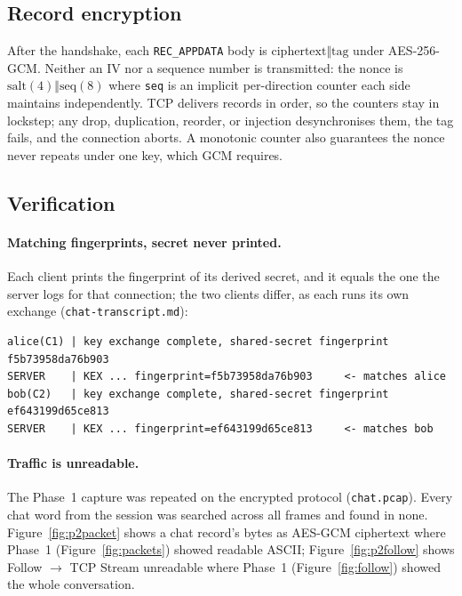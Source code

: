 \documentclass[11pt,a4paper]{article}
\begin{document}
\subsection{Record encryption}

After the handshake, each \texttt{REC\_APPDATA} body is $\text{ciphertext} \Vert \text{tag}$ under
AES-256-GCM. Neither an IV nor a sequence number is transmitted: the nonce is
$\text{salt}(4) \Vert \text{seq}(8)$ where \texttt{seq} is an implicit per-direction counter each side
maintains independently. TCP delivers records in order, so the counters stay in lockstep; any drop,
duplication, reorder, or injection desynchronises them, the tag fails, and the connection aborts. A
monotonic counter also guarantees the nonce never repeats under one key, which GCM requires.

\subsection{Verification}

\paragraph{Matching fingerprints, secret never printed.} Each client prints the fingerprint of its
derived secret, and it equals the one the server logs for that connection; the two clients differ, as
each runs its own exchange (\texttt{chat-transcript.md}):

\begin{lstlisting}
alice(C1) | key exchange complete, shared-secret fingerprint f5b73958da76b903
SERVER    | KEX ... fingerprint=f5b73958da76b903     <- matches alice
bob(C2)   | key exchange complete, shared-secret fingerprint ef643199d65ce813
SERVER    | KEX ... fingerprint=ef643199d65ce813     <- matches bob
\end{lstlisting}

\paragraph{Traffic is unreadable.} The Phase~1 capture was repeated on the encrypted protocol
(\texttt{chat.pcap}). Every chat word from the session was searched across all frames and found in
none. Figure~\ref{fig:p2packet} shows a chat record's bytes as AES-GCM ciphertext where Phase~1
(Figure~\ref{fig:packets}) showed readable ASCII; Figure~\ref{fig:p2follow} shows Follow $\rightarrow$ TCP
Stream unreadable where Phase~1 (Figure~\ref{fig:follow}) showed the whole conversation.
\end{document}

